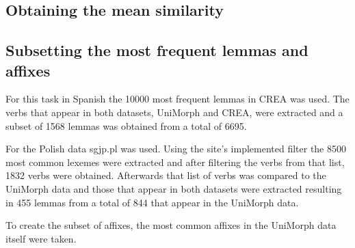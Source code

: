 \documentclass[12pt]{article}
\begin{document}
\subsection{Obtaining the mean similarity}


\subsection{Subsetting the most frequent lemmas and affixes}

For this task in Spanish the 10000 most frequent lemmas in CREA was used. The verbs that appear in both datasets, UniMorph and CREA, were extracted and a subset of 1568 lemmas was obtained from a total of 6695. 

For the Polish data sgjp.pl was used. Using the site's implemented filter the 8500 most common lexemes were extracted and after filtering the verbs from that list, 1832 verbs were obtained. Afterwards that list of verbs was compared to the UniMorph data and  those that appear in both datasets were extracted resulting in 455 lemmas from a total of 844 that appear in the UniMorph data.

To create the subset of affixes, the most common affixes in the UniMorph data itself were taken.
\end{document}
